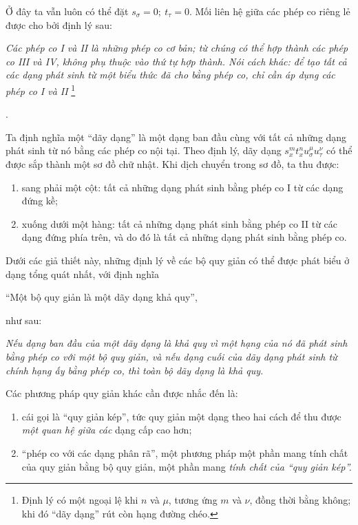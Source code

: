 \documentclass[11pt]{article}
\providecommand{\srcfn}[2]{%
  \begingroup
  \renewcommand{\thefootnote}{#1}%
  \footnote{#2}%
  \addtocounter{footnote}{-1}%
  \endgroup}
\providecommand{\srcspaced}[1]{\emph{#1}}
\begin{document}
Ở đây ta vẫn luôn có thể đặt $s_\sigma=0;\ t_\tau=0$. Mối liên hệ giữa các phép co riêng lẻ được cho bởi định lý sau:

\srcspaced{Các phép co I và II là những phép co cơ bản; từ chúng có thể hợp thành các phép co III và IV, không phụ thuộc vào thứ tự hợp thành. Nói cách khác: để tạo tất cả các dạng phát sinh từ một biểu thức đã cho bằng phép co, chỉ cần áp dụng các phép co I và II}\srcfn{2)}{Định lý có một ngoại lệ khi $n$ và $\mu$, tương ứng $m$ và $\nu$, đồng thời bằng không; khi đó ``dãy dạng'' rút còn hạng đường chéo.}.

Ta định nghĩa một ``dãy dạng'' là một dạng ban đầu cùng với tất cả những dạng phát sinh từ nó bằng các phép co nội tại. Theo định lý, dãy dạng $s_x^m t_x^n u_\sigma^\mu u_\tau^\nu$ có thể được sắp thành một sơ đồ chữ nhật. Khi dịch chuyển trong sơ đồ, ta thu được:
\begin{enumerate}
\item sang phải một cột: tất cả những dạng phát sinh bằng phép co I từ các dạng đứng kề;
\item xuống dưới một hàng: tất cả những dạng phát sinh bằng phép co II từ các dạng đứng phía trên, và do đó là tất cả những dạng phát sinh bằng phép co.
\end{enumerate}

Dưới các giả thiết này, những định lý về các bộ quy giản có thể được phát biểu ở dạng tổng quát nhất, với định nghĩa
\begin{center}
``Một bộ quy giản là một dãy dạng khả quy'',
\end{center}
như sau:

\begin{center}
\srcspaced{Nếu dạng ban đầu của một dãy dạng là khả quy vì một hạng của nó đã phát sinh bằng phép co với một bộ quy giản, và nếu dạng cuối của dãy dạng phát sinh từ chính hạng ấy bằng phép co, thì toàn bộ dãy dạng là khả quy.}
\end{center}

Các phương pháp quy giản khác cần được nhắc đến là:
\begin{enumerate}
\item cái gọi là ``quy giản kép'', tức quy giản một dạng theo hai cách để thu được \srcspaced{một quan hệ giữa các} dạng cấp cao hơn;
\item ``phép co với các dạng phân rã'', một phương pháp một phần mang tính chất của quy giản bằng bộ quy giản, một phần mang \srcspaced{tính chất của ``quy giản kép''.}
\end{enumerate}
\end{document}
